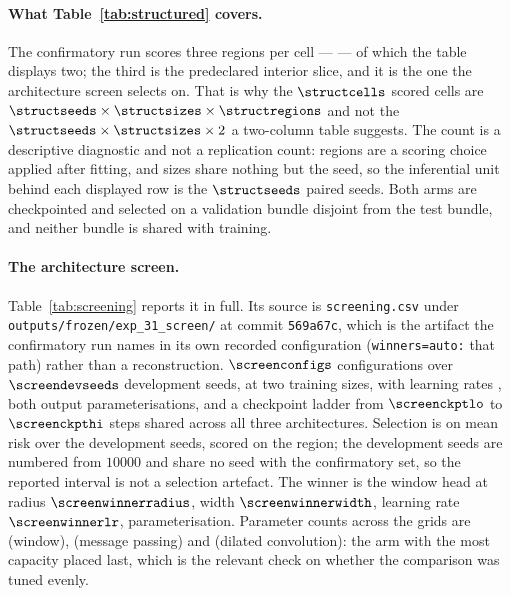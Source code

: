 \paragraph{What Table~\ref{tab:structured} covers.} The confirmatory run scores
three regions per cell --- \structregionlist{} --- of which the table displays
two; the third is the predeclared interior slice, and it is the one the
architecture screen selects on. That is why the $\structcells$ scored cells are
$\structseeds \times \structsizes \times \structregions$ and not the
$\structseeds \times \structsizes \times 2$ a two-column table suggests. The
count is a descriptive diagnostic and not a replication count: regions are a
scoring choice applied after fitting, and sizes share nothing but the seed, so
the inferential unit behind each displayed row is the $\structseeds$ paired
seeds. Both arms are checkpointed and selected on a validation bundle disjoint
from the test bundle, and neither bundle is shared with training.

\paragraph{The architecture screen.} Table~\ref{tab:screening} reports it in
full. Its source is \texttt{screening.csv} under
\texttt{outputs/frozen/exp\_31\_screen/} at commit \texttt{569a67c}, which is the
artifact the confirmatory run names in its own recorded configuration
(\texttt{winners=auto:} that path) rather than a reconstruction. $\screenconfigs$ configurations over $\screendevseeds$
development seeds, at two training sizes, with learning rates
\screenlrs{}, both output parameterisations, and a checkpoint ladder from
$\screenckptlo$ to $\screenckpthi$ steps shared across all three
architectures. Selection is on mean risk over the development seeds, scored on
the \screenregion{} region; the development seeds are numbered from $10000$ and
share no seed with the confirmatory set, so the reported interval is not a
selection artefact. The winner is the window head at radius
$\screenwinnerradius$, width $\screenwinnerwidth$, learning rate
$\screenwinnerlr$, \screenwinnermode{} parameterisation. Parameter counts
across the grids are \screenwindowparams{} (window), \screenbimpparams{}
(message passing) and \screenconvparams{} (dilated convolution): the arm with
the most capacity placed last, which is the relevant check on whether the
comparison was tuned evenly.

